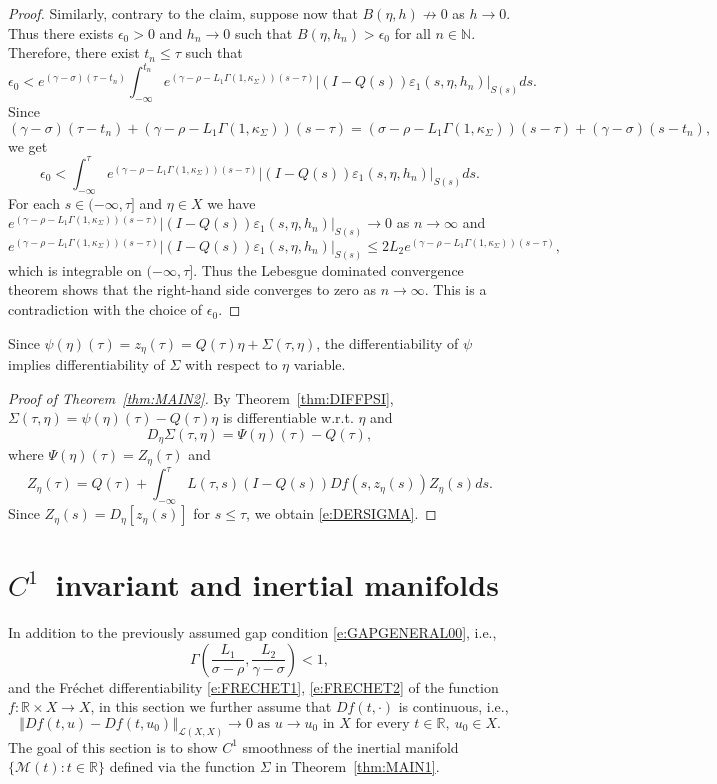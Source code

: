 \documentclass[a4paper,11pt,reqno]{amsart}
\theoremstyle{plain}
\theoremstyle{definition}
\numberwithin{equation}{section}
\newcommand{\N}{\mathbb{N}}
\newcommand{\R}{\mathbb{R}}
\newcommand{\calm}{\mathcal M}
\newcommand{\norm}[1]{\left\Vert#1\right\Vert}
\newcommand{\eps}{\varepsilon}
\renewcommand{\leq}{\leqslant}
\begin{document}
\begin{proof}
Similarly, contrary to the claim, suppose now that $B(\eta,h)\not\to 0$ as $h\to 0$. Thus there exists $\epsilon_0>0$ and $h_n\to 0$ such that $B(\eta,h_n)>\epsilon_0$ for all $n\in\N$. Therefore, there exist $t_n\leq\tau$ such that 
$$\epsilon_0<e^{(\gamma-\sigma)(\tau-t_n)}\int_{-\infty}^{t_n}e^{(\gamma-\rho-L_1\Gamma(1,\kappa_\Sigma))(s-\tau)}|(I-Q(s))\eps_1(s,\eta,h_n)|_{S(s)}ds.$$
Since $$(\gamma-\sigma)(\tau-t_n)+(\gamma-\rho-L_1\Gamma(1,\kappa_\Sigma))(s-\tau)=(\sigma-\rho-L_1\Gamma(1,\kappa_\Sigma))(s-\tau)+(\gamma-\sigma)(s-t_n),$$
we get
$$\epsilon_0<\int_{-\infty}^{\tau}e^{(\gamma-\rho-L_1\Gamma(1,\kappa_\Sigma))(s-\tau)}|(I-Q(s))\eps_1(s,\eta,h_n)|_{S(s)}ds.$$
For each $s\in(-\infty,\tau]$ and $\eta\in X$ we have $e^{(\gamma-\rho-L_1\Gamma(1,\kappa_\Sigma))(s-\tau)}|(I-Q(s))\eps_1(s,\eta,h_n)|_{S(s)}\to 0$ as $n\to\infty$ and $$e^{(\gamma-\rho-L_1\Gamma(1,\kappa_\Sigma))(s-\tau)}|(I-Q(s))\eps_1(s,\eta,h_n)|_{S(s)}\leq 2L_2e^{(\gamma-\rho-L_1\Gamma(1,\kappa_\Sigma))(s-\tau)},$$ 
which is integrable on $(-\infty,\tau]$. Thus the Lebesgue dominated convergence theorem shows that the right-hand side converges to zero as $n\to\infty$. This is a contradiction with the choice of $\epsilon_0$.
\end{proof}

Since $\psi(\eta)(\tau)=z_{\eta}(\tau) = Q(\tau)\eta+\Sigma(\tau,\eta)$, the differentiability of $\psi$ implies differentiability of $\Sigma$ with respect to $\eta$ variable. 

\begin{proof}[Proof of Theorem~\ref{thm:MAIN2}]
By Theorem~\ref{thm:DIFFPSI}, $\Sigma(\tau,\eta)=\psi(\eta)(\tau)-Q(\tau)\eta$ is differentiable w.r.t. $\eta$ and
\begin{equation}\label{e:DERIVFORMULA}
D_\eta\Sigma(\tau,\eta)=\Psi(\eta)(\tau)-Q(\tau),
\end{equation}
where $\Psi(\eta)(\tau)=Z_{\eta}(\tau)$ and
$$Z_\eta(\tau)=Q(\tau)+\int_{-\infty}^{\tau}L(\tau,s)(I-Q(s))Df(s,z_\eta(s))Z_{\eta}(s)ds.$$
Since $Z_{\eta}(s)=D_\eta[z_{\eta}(s)]$ for $s\leq\tau$, we obtain \eqref{e:DERSIGMA}.
\end{proof}

\section{\texorpdfstring{$C^1$}\ \  invariant and inertial manifolds}\label{sec:c1}
In addition to the previously assumed gap condition \eqref{e:GAPGENERAL00}, i.e.,
$$\Gamma\left(\frac{L_1}{\sigma-\rho},\frac{L_2}{\gamma-\sigma}\right)<1,$$
and the Fr\'echet differentiability \eqref{e:FRECHET1}, \eqref{e:FRECHET2} of the function $f\colon \R\times X\to X$, 
in this section we further assume that $Df(t,\cdot)$ is continuous, i.e.,
\begin{equation}\label{e:FRECHET3}
\norm{Df(t,u)-Df(t,u_0)}_{\mathcal{L}(X,X)}\to 0\text{ as }u\to u_0\text{ in }X\text{ for every }t\in\R,\ u_0\in X. 
\end{equation}
The goal of this section is to show $C^1$ smoothness of the inertial manifold $\{\calm(t)\colon t\in\R\}$ defined via the function $\Sigma$ in Theorem~\ref{thm:MAIN1}.
\end{document}
